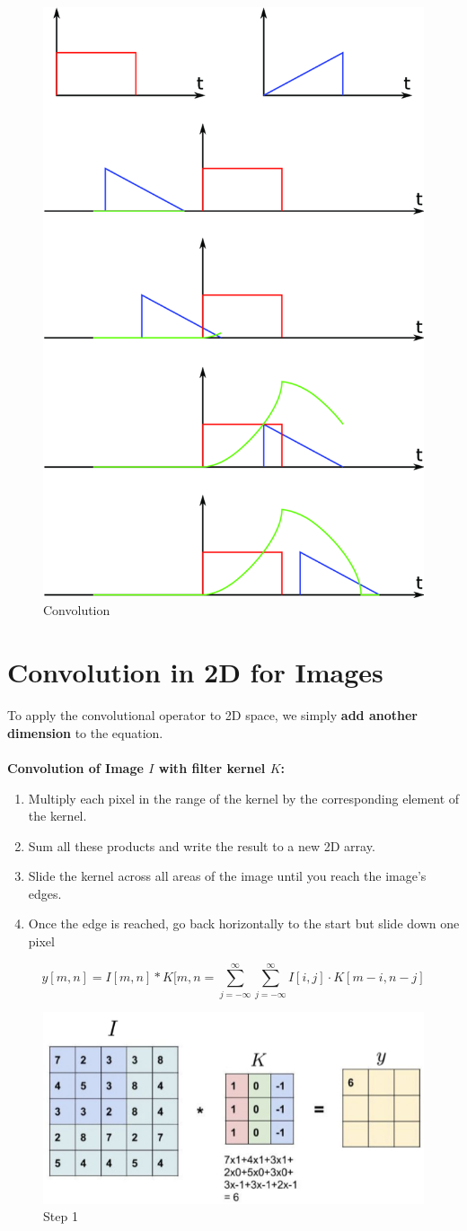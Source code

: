 \begin{figure} [h!t]
    \centering
    \includegraphics[width=0.27\linewidth]{convolution.png}
    \caption{Convolution}
    \label{fig:enter-label}
\end{figure}

\section{Convolution in 2D for Images}

To apply the convolutional operator to 2D space, we simply \textbf{add another dimension} to the equation.\\

\\\textbf{Convolution of Image \( I \) with filter kernel \( K \):}
\begin{enumerate}
    \item Multiply each pixel in the range of the kernel by the corresponding element of the kernel.
    \item Sum all these products and write the result to a new 2D array.
    \item Slide the kernel across all areas of the image until you reach the image's edges.
    \item Once the edge is reached, go back horizontally to the start but slide down one pixel
\end{enumerate}


\[y[m,n] = I[m,n] * K[m,n = \sum_{j=-\infty}^{\infty} \sum_{j=-\infty}^{\infty} I[i,j]\cdot K[m-i, n-j]\] 
\begin{figure}[h!t]
    \centering
    \includegraphics[width=0.5\linewidth]{convex1.png}
    \caption{Step 1}
    \label{fig:enter-label}
\end{figure}

